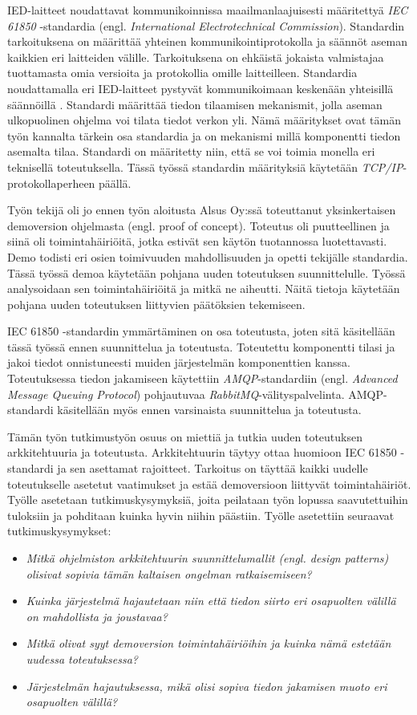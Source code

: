 IED-laitteet noudattavat kommunikoinnissa maailmanlaajuisesti määritettyä \emph{IEC 61850} -standardia (engl. \emph{International Electrotechnical Commission}). Standardin tarkoituksena on määrittää yhteinen kommunikointiprotokolla ja säännöt aseman kaikkien eri laitteiden välille. Tarkoituksena on ehkäistä jokaista valmistajaa tuottamasta omia versioita ja protokollia omille laitteilleen. Standardia noudattamalla eri IED-laitteet pystyvät kommunikoimaan keskenään yhteisillä säännöillä \cite[s.~624]{Mackiewicz2006}. Standardi määrittää tiedon tilaamisen mekanismit, jolla aseman ulkopuolinen ohjelma voi tilata tiedot verkon yli. Nämä määritykset ovat tämän työn kannalta tärkein osa standardia ja on mekanismi millä komponentti tiedon asemalta tilaa. Standardi on määritetty niin, että se voi toimia monella eri teknisellä toteutuksella. Tässä työssä standardin määrityksiä käytetään \emph{TCP/IP}-protokollaperheen päällä.

Työn tekijä oli jo ennen työn aloitusta Alsus Oy:ssä toteuttanut yksinkertaisen demoversion ohjelmasta (engl. proof of concept). Toteutus oli puutteellinen ja siinä oli toimintahäiriöitä, jotka estivät sen käytön tuotannossa luotettavasti. Demo todisti eri osien toimivuuden mahdollisuuden ja opetti tekijälle standardia. Tässä työssä demoa käytetään pohjana uuden toteutuksen suunnittelulle. Työssä analysoidaan sen toimintahäiriöitä ja mitkä ne aiheutti. Näitä tietoja käytetään pohjana uuden toteutuksen liittyvien päätöksien tekemiseen.

IEC 61850 -standardin ymmärtäminen on osa toteutusta, joten sitä käsitellään tässä työssä ennen suunnittelua ja toteutusta. Toteutettu komponentti tilasi ja jakoi tiedot onnistuneesti muiden järjestelmän komponenttien kanssa. Toteutuksessa tiedon jakamiseen käytettiin \emph{AMQP}-standardiin (engl. \emph{Advanced Message Queuing Protocol}) pohjautuvaa \emph{RabbitMQ}-välityspalvelinta. AMQP-standardi käsitellään myös ennen varsinaista suunnittelua ja toteutusta.

Tämän työn tutkimustyön osuus on miettiä ja tutkia uuden toteutuksen arkkitehtuuria ja toteutusta. Arkkitehtuurin täytyy ottaa huomioon IEC 61850 -standardi ja sen asettamat rajoitteet. Tarkoitus on täyttää kaikki uudelle toteutukselle asetetut vaatimukset ja estää demoversioon liittyvät toimintahäiriöt. Työlle asetetaan tutkimuskysymyksiä, joita peilataan työn lopussa saavutettuihin tuloksiin ja pohditaan kuinka hyvin niihin päästiin. Työlle asetettiin seuraavat tutkimuskysymykset:
\begin{itemize}
	\item \emph{Mitkä ohjelmiston arkkitehtuurin suunnittelumallit (engl. design patterns) olisivat sopivia tämän kaltaisen ongelman ratkaisemiseen?}
	\item \emph{Kuinka järjestelmä hajautetaan niin että tiedon siirto eri osapuolten välillä on mahdollista ja joustavaa?}
	\item \emph{Mitkä olivat syyt demoversion toimintahäiriöihin ja kuinka nämä estetään uudessa toteutuksessa?}
	\item \emph{Järjestelmän hajautuksessa, mikä olisi sopiva tiedon jakamisen muoto eri osapuolten välillä?}
\end{itemize}